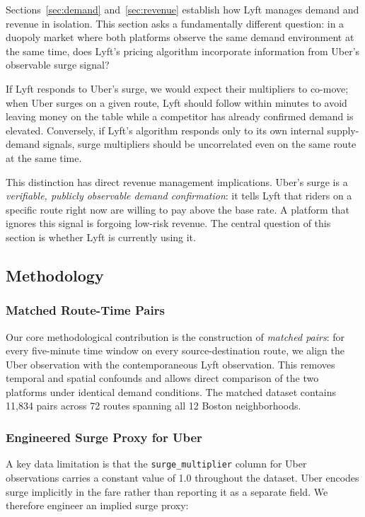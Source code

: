 \documentclass[11pt, letterpaper]{article}
\begin{document}
Sections~\ref{sec:demand} and~\ref{sec:revenue} establish how Lyft manages
demand and revenue in isolation. This section asks a fundamentally different
question: in a duopoly market where both platforms observe the same demand
environment at the same time, does Lyft's pricing algorithm incorporate
information from Uber's observable surge signal?

If Lyft responds to Uber's surge, we would expect their multipliers to
co-move; when Uber surges on a given route, Lyft should follow within
minutes to avoid leaving money on the table while a competitor has already
confirmed demand is elevated. Conversely, if Lyft's algorithm responds
only to its own internal supply-demand signals, surge multipliers should
be uncorrelated even on the same route at the same time.

This distinction has direct revenue management implications. Uber's surge is
a \textit{verifiable, publicly observable demand confirmation}: it tells Lyft
that riders on a specific route right now are willing to pay above the base
rate. A platform that ignores this signal is forgoing low-risk revenue. The
central question of this section is whether Lyft is currently using it.

\subsection{Methodology}

\subsubsection{Matched Route-Time Pairs}

Our core methodological contribution is the construction of
\textit{matched pairs}: for every five-minute time window on every
source-destination route, we align the Uber observation with the
contemporaneous Lyft observation. This removes temporal and spatial
confounds and allows direct comparison of the two platforms under
identical demand conditions. The matched dataset contains 11,834 pairs
across 72 routes spanning all 12 Boston neighborhoods.

\subsubsection{Engineered Surge Proxy for Uber}

A key data limitation is that the \texttt{surge\_multiplier} column
for Uber observations carries a constant value of 1.0 throughout the
dataset. Uber encodes surge implicitly in the fare rather than
reporting it as a separate field. We therefore engineer an implied surge
proxy:
\end{document}
